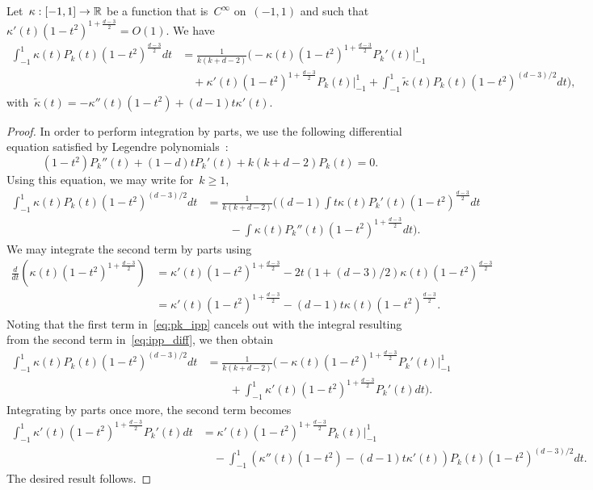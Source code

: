 \begin{lemma}
\label{lemma:ode_recursion}
Let~$\kappa: [-1,1] \to {\mathbb R}$ be a function that is~$C^\infty$ on~$(-1,1)$ and such that~$\kappa'(t) (1-t^2)^{1+\frac{d-3}{2}} = O(1)$. We have
\begin{align}
\int_{-1}^1 \kappa(t) P_k(t) (1-t^2)^{\frac{d-3}{2}} dt &= \frac{1}{k(k+d-2)} \Big( -\kappa(t)(1 - t^2)^{1 + \frac{d-3}{2}} P_k'(t) \Big|_{-1}^1 \\
	&\quad+ \kappa'(t) (1 - t^2)^{1 + \frac{d-3}{2}} P_k(t) \Big|_{-1}^1  + \int_{-1}^1 \tilde \kappa(t) P_k(t) (1 - t^2)^{(d-3)/2} dt \Big),
\end{align}
with~$\tilde \kappa(t) = -\kappa''(t)(1 - t^2) + (d-1)t \kappa'(t)$.
\end{lemma}
\begin{proof}
In order to perform integration by parts, we use the following differential equation satisfied by Legendre polynomials~\citep[see, \eg,][Proposition 4.20]{costas2014spherical}:
\begin{equation}
(1 - t^2) P_k''(t) + (1 - d) t P_k'(t) + k(k + d - 2) P_k(t) = 0.
\end{equation}
Using this equation, we may write for~$k \geq 1$,
\begin{align}
\label{eq:pk_ipp}
\int_{-1}^1 \kappa(t) P_k(t) (1 - t^2)^{(d-3)/2} dt 
	&= \frac{1}{k(k+d-2)} \Big( (d-1) \int t \kappa(t) P_k'(t) (1 - t^2)^{\frac{d-3}{2}} dt \\
		&\qquad- \int \kappa(t) P_k''(t) (1 - t^2)^{1 + \frac{d-3}{2}}dt \Big).
\end{align}
We may integrate the second term by parts using
\begin{align}
\frac{d}{dt} \left( \kappa(t) (1 - t^2)^{1 + \frac{d-3}{2}} \right)
	&= \kappa'(t) (1 - t^2)^{1 + \frac{d-3}{2}} - 2t(1 + (d-3)/2) \kappa(t) (1 - t^2)^{\frac{d-3}{2}} \nonumber\\
	&= \kappa'(t) (1 - t^2)^{1 + \frac{d-3}{2}} - (d-1) t \kappa(t)(1 - t^2)^{\frac{d - 3}{2}} \label{eq:ipp_diff}.
\end{align}
Noting that the first term in~\eqref{eq:pk_ipp} cancels out with the integral resulting from the second term in~\eqref{eq:ipp_diff}, we then obtain
\begin{align*}
\int_{-1}^1 \kappa(t) P_k(t) (1 - t^2)^{(d-3)/2} dt &= \frac{1}{k(k+d-2)} \Big( -\kappa(t)(1 - t^2)^{1 + \frac{d-3}{2}} P_k'(t) \Big|_{-1}^1  \\
	&\qquad + \int_{-1}^1 \kappa'(t) (1 - t^2)^{1 + \frac{d-3}{2}} P_k'(t) dt \Big).
\end{align*}
Integrating by parts once more, the second term becomes
\begin{align}
\int_{-1}^1 \kappa'(t) (1 - t^2)^{1 + \frac{d-3}{2}} P_k'(t) dt &= \kappa'(t) (1 - t^2)^{1 + \frac{d-3}{2}} P_k(t) \Big|_{-1}^1 \nonumber \\
	&\quad- \int_{-1}^1 (\kappa''(t)(1 - t^2) - (d-1)t \kappa'(t)) P_k(t) (1 - t^2)^{(d-3)/2} dt.
\end{align}
The desired result follows.
\end{proof}

